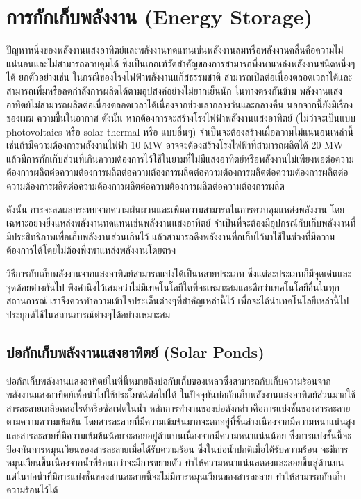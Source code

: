 \documentclass[11pt]{article}
\begin{document}
\section{การกักเก็บพลังงาน (Energy Storage)}
\label{sec:org5223ae8}

ปัญหาหนึ่งของพลังงานแสงอาทิตย์และพลังงานทดแทนเช่นพลังงานลมหรือพลังงานคลื่นคือความไม่แน่นอนและไม่สามารถควบคุมได้ ซึ่งเป็นเกณฑ์วัดสำคัญของการสามารถพึ่งพาแหล่งพลังงานชนิดหนึ่งๆได้ ยกตัวอย่างเช่น ในกรณีของโรงไฟฟ้าพลังงานแก็สธรรมชาติ สามารถเปิดต่อเนื่องตลอดเวลาได้และสามารถเพิ่มหรือลดกำลังการผลิดได้ตามอุปสงค์อย่างไม่ยากเย็นนัก ในทางตรงกันข้าม พลังงานแสงอาทิตย์ไม่สามารถผลิตต่อเนื่องตลอดเวลาได้เนื่องจากช่วงเลากลางวันและกลางคืน นอกจากนี้ยังมีเรื่องของเมฆ ความชื้นในอากาศ ดังนั้น หากต้องการจะสร้างโรงไฟฟ้าพลังงานแสงอาทิตย์ (ไม่ว่าจะเป็นแบบ photovoltaics หรือ solar thermal หรือ แบบอื่นๆ) จำเป็นจะต้องสร้างเผื่อความไม่แน่นอนเหล่านี้ เช่นถ้ามีความต้องการพลังงานไฟฟ้า 10 MW อาจจะต้องสร้างโรงไฟฟ้าที่สามารถผลิตได้ 20 MW แล้วมีการกักเก็บส่วนที่เกินความต้องการไว้ใช้ในยามที่ไม่มีแสงอาทิตย์หรือพลังงานไม่เพียงพอต่อความต้องการผลิตต่อความต้องการผลิตต่อความต้องการผลิตต่อความต้องการผลิตต่อความต้องการผลิตต่อความต้องการผลิตต่อความต้องการผลิตต่อความต้องการผลิตต่อความต้องการผลิต 

ดังนั้น การจะลดผลกระทบจากความผันผวนและเพิ่มความสามารถในการควบคุมแหล่งพลังงาน โดยเฉพาะอย่างยิ่งแหล่งพลังงานทดแทนเช่นพลังงานแสงอาทิตย์ จำเป็นที่จะต้องมีอุปกรณ์กับเก็บพลังงานที่มีประสิทธิภาพเพื่อเก็บพลังงานส่วนเกินไว้ แล้วสามารถดึงพลังงานที่กเก็บไว้มาใช้ในช่วงที่มีความต้องการได้โดยไม่ต้องพึ่งพาแหล่งพลังงานโดยตรง

วิธีการกับเก็บพลังงานจากแสงอาทิตย์สามารถแบ่งได้เป็นหลายประเภท ซึ่งแต่ละประเภทก็มีจุดเด่นและจุดด้อยต่างกันไป พึงคำนึงไว้เสมอว่าไม่มีเทคโนโลยีใดที่จะเหมาะสมและดีกว่าเทคโนโลยีอื่นในทุกสถานการณ์ เราจึงควรทำความเข้าใจประเด็นต่างๆที่สำคัญเหล่านี้ไว้ เพื่อจะได้นำเทคโนโลยีเหล่านี้ไปประยุกต์ใช้ในสถานการณ์ต่างๆได้อย่างเหมาะสม

\subsection{บ่อกักเก็บพลังงานแสงอาทิตย์ (Solar Ponds)}
\label{sec:org441f245}

บ่อกักเก็บพลังงานแสงอาทิตย์ในที่นี้หมายถึงบ่อกับเก็บของเหลวซึ่งสามารถกับเก็บความร้อนจากพลังงานแสงอาทิตย์เพื่อนำไปใช้ประโยชน์ต่อไปได้ ในปัจจุบันบ่อกักเก็บพลังงานแสงอาทิตย์ส่วนมากใช้สารละลายเกลือคลอไรด์หรือซัลเฟตในน้ำ หลักการทำงานของบ่อดังกล่าวคือการแบ่งชั้นของสารละลายตามความความเข้มข้น โดยสารละลายที่มีความเข้มข้นมากจะตกอยู่ที่ชั้นล่างเนื่องจากมีความหนาแน่นสูง และสารละลายที่มีความเข้มข้นน้อยจะลอยอยู่ด้านบนเนื่องจากมีความหนาแน่นน้อย ซึ่งการแบ่งชั้นนี้จะป้องกันการหมุนเวียนของสารละลายเมื่อได้รับความร้อน ซึ่งในบ่อน้ำปกติเมื่อได้รับความร้อน จะมีการหมุนเวียนขึ้นเนื่องจากน้ำที่ร้อนกว่าจะมีการขยายตัว ทำให้ความหนาแน่นลดลงและลอยขึ้นสู่ด้านบน แต่ในบ่อน้ำที่มีการแบ่งชั้นของสานละลายนี้จะไม่มีการหมุนเวียนของสารละลาย ทำให้สามารถกักเก็บความร้อนไว้ได้
\end{document}
